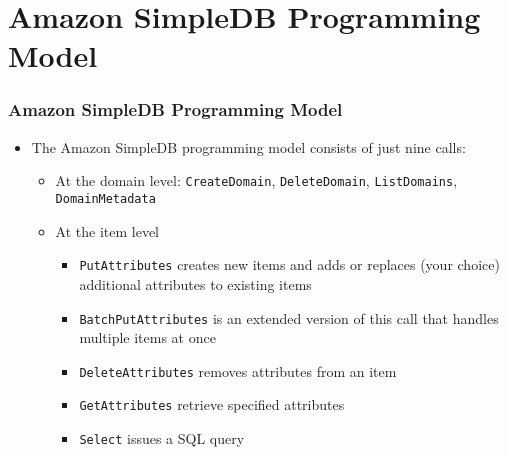 \documentclass{beamer}
\begin{document}
\section{Amazon SimpleDB Programming Model}
\begin{frame}[fragile]
\frametitle{Amazon SimpleDB Programming Model}
\begin{itemize}
 \item The Amazon SimpleDB programming model consists of just nine calls:
 \begin{itemize}
 \item At the domain level: \texttt{CreateDomain}, \texttt{DeleteDomain}, \texttt{ListDomains}, \texttt{DomainMetadata}
 \item At the item level
 \begin{itemize}
 \item \texttt{PutAttributes} creates new items and adds or replaces (your choice) additional attributes to existing items
 \item \texttt{BatchPutAttributes} is an extended version of this call that handles multiple items at once
 \item \texttt{DeleteAttributes} removes attributes from an item
 \item \texttt{GetAttributes} retrieve specified attributes
 \item \texttt{Select} issues a SQL query
 \end{itemize}
\end{itemize}

\end{itemize}
\end{frame}
\end{document}
